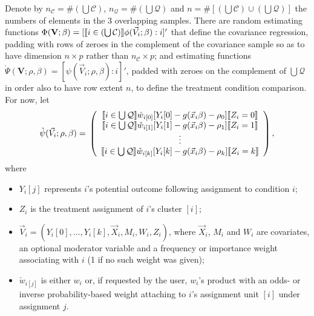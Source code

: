 \documentclass{article}
\DeclarePairedDelimiter{\indicator}{\llbracket}{\rrbracket}
\newcommand{\owt}[1][{[z_{i}]}]{\ensuremath{\check{w}_{i#1}}}
\begin{document}
Denote by $n_{\mathcal{C}}= \# \left( \bigcup \mathcal{C}\right)$,
$n_{\mathcal{Q}}= \# \left( \bigcup \mathcal{Q}\right)$ and
$n = \# \left[\left( \bigcup \mathcal{C}\right) \cup \left(\bigcup
    \mathcal{Q}\right)\right]$ the numbers of elements in the 3
overlapping samples. There are random estimating functions
$\Phi(\mathbf{V}; \beta ) = [\indicator{ i \in
  \left(\bigcup\mathcal{C}\right)}\phi(\vec{V}_{i}; \beta) : i]'$ that define the covariance
regression, padding with rows of zeroes in
the complement of the covariance sample so
as to have dimension $n \times p$ rather than $n_{\mathcal{C}}\times
p$; and estimating functions
$\grave{\Psi}(\mathbf{V}; \rho, \beta) = [\psi(\vec{V}_{i}; \rho,
\beta): i]'$, padded with zeroes on the complement of $\bigcup
\mathcal{Q}$ in order also to have row extent $n$, to define the
treatment condition comparison.  For now, let
\begin{equation}
         \label{eq:5}
         \grave{\psi}(\vec{V}_{i}; \rho, \beta) =\\
         \left( \begin{array}{c}
           \indicator{i \in \bigcup \mathcal{Q}}\owt[{[0]}] [Y_{i}[0] - g(\vec{x}_{i}\beta)-
                  \rho_{0}]\indicator{Z_{i}=0}\\
           \indicator{i \in \bigcup \mathcal{Q}}\owt[{[1]}] [Y_{i}[1] - g(\vec{x}_{i}\beta)-
                  \rho_{1}]\indicator{Z_{i}=1}\\
                  \vdots \\
           \indicator{i \in \bigcup \mathcal{Q}}\owt[{[k]}] [Y_{i}[k] - g(\vec{x}_{i}\beta)-
                  \rho_{k}]\indicator{Z_{i}=k}\\
                \end{array}\right),
\end{equation}
where
\begin{itemize}
\item $Y_{i}[j]$ represents $i$'s potential outcome following
  assignment to condition $i$;
\item $Z_{i}$ is the treatment assignment of $i$'s cluster $[i]$;
\item $\vec{V}_{i} = (Y_{i}[0],\ldots, Y_{i}[k], \vec{X}_{i}, M_{i}, W_{i}, Z_{i})$, where $\vec{X}_{i}$, $M_{i}$ and $W_{i}$ are covariates, an optional moderator variable and a
  frequency or importance weight associating with $i$ (1 if no such weight was
  given);
\item $\owt[{[j]}]$ is either $w_i$ or,
   if requested by the user, $w_{i}$'s product with an
  odds- or inverse probability-based weight attaching to $i$'s
  assignment unit $[i]$ under assignment $j$.
\end{itemize}
\end{document}
